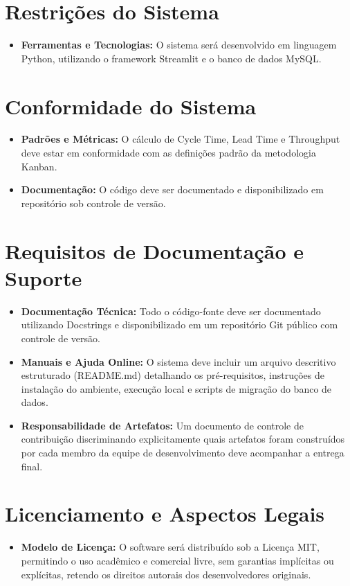 \section{Restrições do Sistema}
\begin{itemize}
    \item \textbf{Ferramentas e Tecnologias:} O sistema será desenvolvido em 
    linguagem Python, utilizando o framework Streamlit e o banco de dados MySQL.
\end{itemize}

\section{Conformidade do Sistema}
\begin{itemize}
    \item \textbf{Padrões e Métricas:} O cálculo de Cycle Time, Lead Time e 
    Throughput deve estar em conformidade com as definições padrão da metodologia 
    Kanban.
    \item \textbf{Documentação:} O código deve ser documentado e disponibilizado 
    em repositório sob controle de versão.
\end{itemize}

\section{Requisitos de Documentação e Suporte}
\begin{itemize}
    \item \textbf{Documentação Técnica:} Todo o código-fonte deve ser documentado 
    utilizando Docstrings e disponibilizado em um repositório Git público com 
    controle de versão.
    \item \textbf{Manuais e Ajuda Online:} O sistema deve incluir um arquivo 
    descritivo estruturado (README.md) detalhando os pré-requisitos, instruções 
    de instalação do ambiente, execução local e scripts de migração do banco de dados.
    \item \textbf{Responsabilidade de Artefatos:} Um documento de controle de 
    contribuição discriminando explicitamente quais artefatos foram construídos por 
    cada membro da equipe de desenvolvimento deve acompanhar a entrega final.
\end{itemize}

\section{Licenciamento e Aspectos Legais}
\begin{itemize}
    \item \textbf{Modelo de Licença:} O software será distribuído sob a Licença 
    MIT, permitindo o uso acadêmico e comercial livre, sem garantias implícitas 
    ou explícitas, retendo os direitos autorais dos desenvolvedores originais.
\end{itemize}
